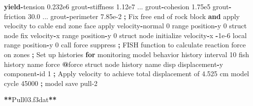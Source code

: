 \documentclass[a4paper, nobind]{templates/ociamthesis}
\newenvironment{Shaded}{\begin{snugshade}}{\end{snugshade}}
\newcommand{\BuiltInTok}[1]{#1}
\newcommand{\ControlFlowTok}[1]{\textcolor[rgb]{0.13,0.29,0.53}{\textbf{#1}}}
\newcommand{\DecValTok}[1]{\textcolor[rgb]{0.00,0.00,0.81}{#1}}
\newcommand{\FloatTok}[1]{\textcolor[rgb]{0.00,0.00,0.81}{#1}}
\newcommand{\KeywordTok}[1]{\textcolor[rgb]{0.13,0.29,0.53}{\textbf{#1}}}
\newcommand{\NormalTok}[1]{#1}
\newcommand{\OperatorTok}[1]{\textcolor[rgb]{0.81,0.36,0.00}{\textbf{#1}}}
\newcommand{\StringTok}[1]{\textcolor[rgb]{0.31,0.60,0.02}{#1}}
\renewenvironment{Shaded}
{
  \vspace{10pt}%
  \begin{snugshade}%
}{%
  \end{snugshade}%
  \vspace{8pt}%
}
\begin{document}
\begin{Shaded}
\begin{Highlighting}[]
                          \ControlFlowTok{yield}\OperatorTok{{-}}\NormalTok{tension }\FloatTok{0.232e6}\NormalTok{ grout}\OperatorTok{{-}}\NormalTok{stiffness }\FloatTok{1.12e7}\NormalTok{ ...}
\NormalTok{                          grout}\OperatorTok{{-}}\NormalTok{cohesion }\FloatTok{1.75e5}\NormalTok{ grout}\OperatorTok{{-}}\NormalTok{friction }\FloatTok{30.0}\NormalTok{ ...}
\NormalTok{                          grout}\OperatorTok{{-}}\NormalTok{perimeter }\FloatTok{7.85e{-}2}
    \OperatorTok{;}\NormalTok{ Fix free end of rock block }\KeywordTok{and} \BuiltInTok{apply}\NormalTok{ velocity to cable end}
\NormalTok{    zone face }\BuiltInTok{apply}\NormalTok{ velocity}\OperatorTok{{-}}\NormalTok{normal }\DecValTok{0} \BuiltInTok{range}\NormalTok{ position}\OperatorTok{{-}}\NormalTok{y }\DecValTok{0}
\NormalTok{    struct node fix velocity}\OperatorTok{{-}}\NormalTok{x }\BuiltInTok{range}\NormalTok{ position}\OperatorTok{{-}}\NormalTok{y }\DecValTok{0}
\NormalTok{    struct node initialize velocity}\OperatorTok{{-}}\NormalTok{x }\OperatorTok{{-}}\FloatTok{1e{-}6}\NormalTok{ local }\BuiltInTok{range}\NormalTok{ position}\OperatorTok{{-}}\NormalTok{y }\DecValTok{0}
\NormalTok{    call }\StringTok{\textquotesingle{}force\textquotesingle{}}\NormalTok{ suppress }\OperatorTok{;}\NormalTok{ FISH function to calculate reaction force on zones}
    \OperatorTok{;}\NormalTok{ Set up histories }\ControlFlowTok{for}\NormalTok{ monitoring model behavior}
\NormalTok{    history interval }\DecValTok{10}
\NormalTok{    fish history name }\StringTok{\textquotesingle{}force\textquotesingle{}} \OperatorTok{@}\NormalTok{force}
\NormalTok{    struct node history name }\StringTok{\textquotesingle{}disp\textquotesingle{}}\NormalTok{ displacement}\OperatorTok{{-}}\NormalTok{y component}\OperatorTok{{-}}\BuiltInTok{id} \DecValTok{1}
    \OperatorTok{;}\NormalTok{ Apply velocity to achieve total displacement of }\FloatTok{4.525}\NormalTok{ cm}
\NormalTok{    model cycle }\DecValTok{45000}
    \OperatorTok{;}
\NormalTok{    model save }\StringTok{\textquotesingle{}pull{-}2\textquotesingle{}}

\OperatorTok{**}\NormalTok{Pull03.f3dat}\OperatorTok{**}


\end{Highlighting}
\end{Shaded}
\end{document}
